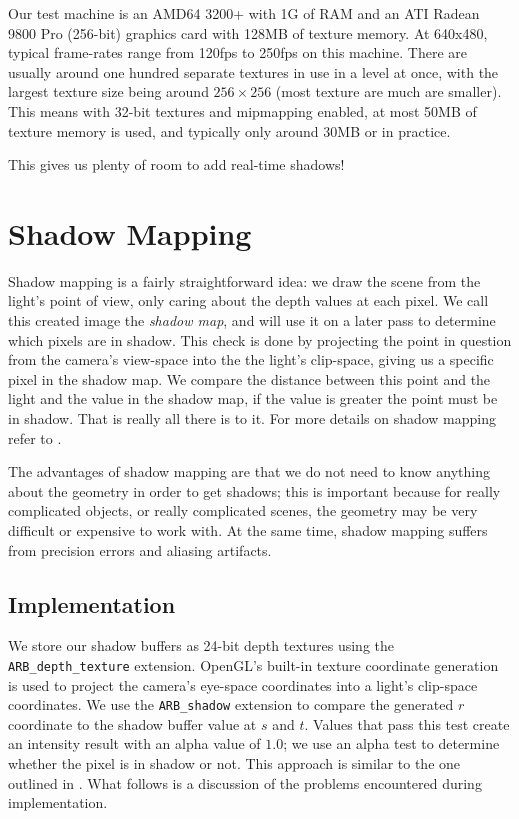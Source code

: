 \documentclass{llncs}
\begin{document}
\begin{multicols}{2}
{Our test machine is an AMD64 3200+ with 1G of RAM and an ATI Radean 9800 Pro
(256-bit) graphics card with 128MB of texture memory.  At 640x480, typical frame-rates
range from 120fps to 250fps on this machine.  There are usually around one hundred 
separate textures in use in a level at once, with the largest texture size being around 
$256 \times 256$ (most texture are much are smaller). This means with 32-bit textures and 
mipmapping enabled, at most 50MB of texture memory is used, and typically 
only around 30MB or in practice.

This gives us plenty of room to add real-time shadows!

\section{Shadow Mapping}
Shadow mapping is a fairly straightforward idea: we draw the scene from the light's
point of view, only caring about the depth values at each pixel.  We call this created
image the \textit{shadow map}, and will use it on a later pass to determine which pixels are 
in shadow.  This check is done by projecting the point in question from the camera's
view-space into the the light's clip-space, giving us a specific pixel in the shadow map.  
We compare the distance between this point and the light and the value in the shadow map, 
if the value is greater the point must be in shadow.  That is really all there is to it. 
For more details on shadow mapping refer to \cite{Haines} \cite{Woo} \cite{nvidia}. 

The advantages of shadow mapping are that we do not need to know anything about the
geometry in order to get shadows; this is important because for really complicated objects,
or really complicated scenes, the geometry may be very difficult or expensive to work with.
At the same time, shadow mapping suffers from precision errors and aliasing artifacts. 

\subsection{Implementation} We store our shadow buffers as 24-bit depth textures
using the {\tt ARB\_depth\_texture} extension.  OpenGL's built-in texture coordinate
generation is used to project the camera's eye-space coordinates into a light's 
clip-space coordinates.  We use the {\tt ARB\_shadow} extension to compare 
the generated $r$ coordinate to the
shadow buffer value at $s$ and $t$.  Values that pass this 
test create an intensity result with an alpha value of $1.0$; we use an alpha test to 
determine whether the pixel is in shadow or not.  This approach is similar to the one 
outlined in \cite{paul}. What follows is a discussion of the problems encountered during
implementation. 

}
\end{multicols}
\end{document}
